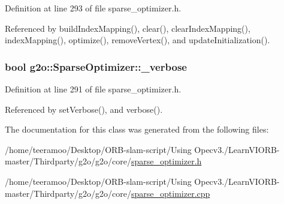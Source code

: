 Definition at line 293 of file sparse\+\_\+optimizer.\+h.



Referenced by build\+Index\+Mapping(), clear(), clear\+Index\+Mapping(), index\+Mapping(), optimize(), remove\+Vertex(), and update\+Initialization().

\subsubsection[{\texorpdfstring{\+\_\+verbose}{_verbose}}]{\setlength{\rightskip}{0pt plus 5cm}bool g2o\+::\+Sparse\+Optimizer\+::\+\_\+verbose\hspace{0.3cm}{\ttfamily [protected]}}\hypertarget{classg2o_1_1SparseOptimizer_a41b3803182a4db6c0ff8c8d4352dd149}{}\label{classg2o_1_1SparseOptimizer_a41b3803182a4db6c0ff8c8d4352dd149}


Definition at line 291 of file sparse\+\_\+optimizer.\+h.



Referenced by set\+Verbose(), and verbose().



The documentation for this class was generated from the following files\+:\begin{DoxyCompactItemize}
\item 
/home/teeramoo/\+Desktop/\+O\+R\+B-\/slam-\/script/\+Using Opecv3./\+Learn\+V\+I\+O\+R\+B-\/master/\+Thirdparty/g2o/g2o/core/\hyperlink{sparse__optimizer_8h}{sparse\+\_\+optimizer.\+h}\item 
/home/teeramoo/\+Desktop/\+O\+R\+B-\/slam-\/script/\+Using Opecv3./\+Learn\+V\+I\+O\+R\+B-\/master/\+Thirdparty/g2o/g2o/core/\hyperlink{sparse__optimizer_8cpp}{sparse\+\_\+optimizer.\+cpp}\end{DoxyCompactItemize}
